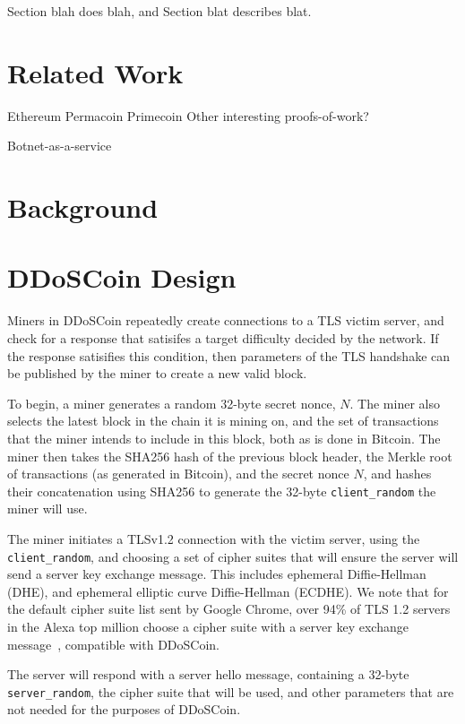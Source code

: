 Section blah does blah, and Section blat describes blat.





\section{Related Work}

Ethereum
Permacoin
Primecoin
Other interesting proofs-of-work?

Botnet-as-a-service

\section{Background}

\section{DDoSCoin Design}

Miners in DDoSCoin repeatedly create connections to a TLS victim server, and
check for a response that satisifes a target difficulty decided by the network.
If the response satisifies this condition, then parameters of the TLS handshake
can be published by the miner to create a new valid block.

To begin, a miner generates a random 32-byte secret nonce, $N$. The miner also
selects the latest block in the chain it is mining on, and the set of
transactions that the miner intends to include in this block, both as is done in
Bitcoin. The miner then takes the SHA256 hash of the previous block header, the
Merkle root of transactions (as generated in Bitcoin), and the secret nonce $N$,
and hashes their concatenation using SHA256 to generate the
32-byte \texttt{client\_random} the miner will use.

The miner initiates a TLSv1.2 connection with the victim server, using the
\texttt{client\_random}, and choosing a set of cipher suites that will ensure
the server will send a server key exchange message. This includes ephemeral
Diffie-Hellman (DHE), and ephemeral elliptic curve Diffie-Hellman (ECDHE). We
note that for the default cipher suite list sent by Google Chrome, over 94\%
of TLS 1.2 servers in the Alexa top million choose a cipher suite with a server key exchange
message~\cite{censys}, compatible with DDoSCoin.


The server will respond with a server hello message, containing a 32-byte
\texttt{server\_random}, the cipher suite that will be used, and other
parameters that are not needed for the purposes of DDoSCoin.

